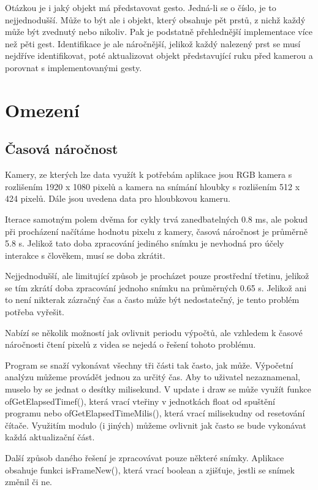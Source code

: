 Otázkou je i jaký objekt má představovat gesto. Jedná-li se o číslo, je to nejjednodušší. Může to být ale i objekt, který obsahuje pět prstů, z nichž každý může být zvednutý nebo nikoliv. Pak je podstatně přehlednější implementace více než pěti gest. Identifikace je ale náročnější, jelikož každý nalezený prst se musí nejdříve identifikovat, poté aktualizovat objekt představující ruku před kamerou a porovnat s implementovanými gesty. 

\section{Omezení}

\subsection{Časová náročnost}
Kamery, ze kterých lze data využít k potřebám aplikace jsou RGB kamera s rozlišením 1920 x 1080 pixelů a kamera na snímání hloubky s rozlišením 512 x 424 pixelů. Dále jsou uvedena data pro hloubkovou kameru.

Iterace samotným polem dvěma for cykly trvá zanedbatelných 0.8 ms, ale pokud při procházení načítáme hodnotu pixelu z kamery, časová náročnost je průměrně 5.8 s. Jelikož tato doba zpracování jediného snímku je nevhodná pro účely interakce s člověkem, musí se doba zkrátit.

Nejjednodušší, ale limitující způsob je procházet pouze prostřední třetinu, jelikož se tím zkrátí doba zpracování jednoho snímku na průměrných 0.65 s. Jelikož ani to není nikterak zázračný čas a často může být nedostatečný, je tento problém potřeba vyřešit.

Nabízí se několik možností jak ovlivnit periodu výpočtů, ale vzhledem k časové náročnosti čtení pixelů z videa se nejedá o řešení tohoto problému.

Program se snaží vykonávat všechny tři části tak často, jak může. Výpočetní analýzu můžeme provádět jednou za určitý čas. Aby to uživatel nezaznamenal, muselo by se jednat o desítky milisekund. V update i draw se může využít funkce ofGetElapsedTimef(), která vrací vteřiny v jednotkách float od spuštění programu nebo ofGetElapsedTimeMilis(), která vrací milisekudny od resetování čítače. Využitím modulo (i jiných) můžeme ovlivnit jak často se bude vykonávat každá aktualizační část.

Další způsob daného řešení je zpracovávat pouze některé snímky. Aplikace obsahuje funkci isFrameNew(), která vrací boolean a zjišťuje, jestli se snímek změnil či ne.


\endinput
